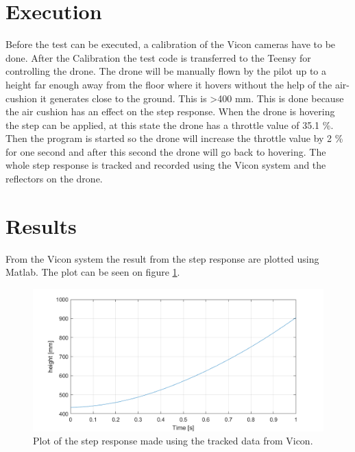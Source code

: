 \section*{Execution}
Before the test can be executed, a calibration of the Vicon cameras have to be done. After the Calibration the test code is transferred to the Teensy for controlling the drone. The drone will be manually flown by the pilot up to a height far enough away from the floor where it hovers without the help of the air-cushion it generates close to the ground. This is >400 mm. This is done because the air cushion has an effect on the step response. When the drone is hovering the step can be applied, at this state the drone has a throttle value of 35.1 \%. Then the program is started so the drone will increase the throttle value by 2 \% for one second and after this second the drone will go back to hovering. The whole step response is tracked and recorded using the Vicon system and the reflectors on the drone.


\section*{Results}
From the Vicon system the result from the step response are plotted using Matlab. The plot can be seen on figure \ref{fig:secondary_stepresponse}.
\begin{figure}[H]
    \centering
    \includegraphics[width=\textwidth]{figures/Appendix/secondary_stepresponse.png}
    \caption{Plot of the step response made using the tracked data from Vicon.}
    \label{fig:secondary_stepresponse}
\end{figure}


